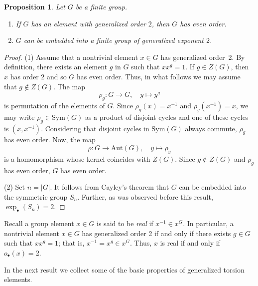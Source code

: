 \documentclass[12pt,leqno]{amsart}
\newtheorem{prop}[theorem]{\sc Proposition}
\theoremstyle{definition}
\begin{document}
\begin{prop}
Let $G$ be a finite group. 
\begin{enumerate}
    \item If $G$ has an element with generalized order $2$, then $G$ has even order.
    \item $G$ can be embedded  into a finite group of generalized exponent $2$.
\end{enumerate}
\end{prop}
\begin{proof}
(1) Assume that a nontrivial element $x\in G$ has generalized order~2. By definition, there exists an element $g$ in $G$ such that $xx^g=1$. If $g\in Z(G)$, then $x$ has order 2 and so $G$ has even order. Thus, in what follows we may assume that $g\notin Z(G)$. The map 
\[
\rho_g:G\rightarrow G,\quad y\mapsto y^g
\]
is  permutation of the elements of $G$. Since $\rho_g(x)=x^{-1}$ and $\rho_g(x^{-1})=x$, we may write $\rho_g\in\mbox{Sym}(G)$ as a product of disjoint cycles and one 
of these cycles is $(x, x^{-1})$. Considering that disjoint cycles in $\mbox{Sym}(G)$ always commute, $\rho_g$ has even order. Now, the map 
\[
\rho: G\rightarrow \mbox{Aut}(G),\quad y\mapsto \rho_y
\]
is a homomorphism whose kernel coincides with $Z(G)$. Since $g\notin Z(G)$ and $\rho_g$ has even order,  $G$ has even order.

(2) Set $n=|G|$. It follows from Cayley's theorem \cite[1.6.8]{Rob} that $G$ can be embedded  into the symmetric group $S_n$. Further, as was observed 
before this result, $\exp_{\bullet}(S_n)=2$. 
\end{proof}



 Recall a group element $x\in G$ is said to be \emph{real} if $x^{-1} \in x^G$. In particular, a nontrivial element $x\in G$ has generalized order 2 if and only if there exists $g \in G$ such that $xx^g = 1$; that is, $x^{-1} = x^g \in x^G$. Thus,  $x$ is real if and only if $o_{\bullet}(x)=2$.







In the next result we collect some of the basic properties of generalized torsion elements.
\end{document}
